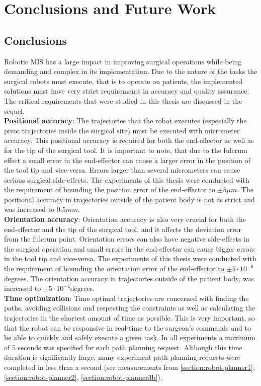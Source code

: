 \chapter{Conclusions and Future Work}

\section{Conclusions}

Robotic MIS has a large impact in improving surgical operations while being demanding and complex in its implementation. Due to the nature of the tasks the surgical robots must execute, that is to operate on patients, the implemented solutions must have very strict requirements in accuracy and quality assurance. The critical requirements that were studied in this thesis are discussed in the sequel.\\

\textbf{Positional accuracy}: The trajectories that the robot executes (especially the pivot trajectories inside the surgical site) must be executed with micrometer accuracy. This positional accuracy is required for both the end-effector as well as for the tip of the surgical tool. It is important to note, that due to the fulcrum effect a small error in the end-effector can cause a larger error in the position of the tool tip and vice-versa. Errors larger than several micrometers can cause serious surgical side-effects. The experiments of this thesis were conducted with the requirement of bounding the position error of the end-effector to $\pm 5μm$. The positional accuracy in trajectories outside of the patient body is not as strict and was increased to $0.5mm$.\\

\textbf{Orientation accuracy}: Orientation accuracy is also very crucial for both the end-effector and the tip of the surgical tool, and it affects the deviation error from the fulcrum point. Orientation errors can also have negative side-effects in the surgical operation and small errors in the end-effector can cause bigger errors in the tool tip and vice-versa. The experiments of this thesis were conducted with the requirement of bounding the orientation error of the end-effector to $\pm 5\cdot 10^{-6}$degrees. The orientation accuracy in trajectories outside of the patient body, was increased to $\pm 5\cdot 10^{-4}$degrees.\\

\textbf{Time optimization}: Time optimal trajectories are concerned with finding the paths, avoiding collisions and respecting the constraints as well as calculating the trajectories in the shortest amount of time as possible. This is very important, so that the robot can be responsive in real-time to the surgeon’s commands and to be able to quickly and safely execute a given task. In all experiments a maximum of 5 seconds was specified for each path planning request. Although this time duration is significantly large, many experiment path planning requests were completed in less than a second (see measurements from \ref{section:robot-planner1}, \ref{section:robot-planner2}, \ref{section:robot-planner3b}).\\


